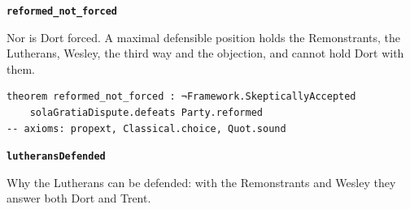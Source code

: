 \documentclass[11pt]{article}
\begin{document}
\par\medskip\noindent\textbf{\texttt{reformed\_\allowbreak{}not\_\allowbreak{}forced}}\par\nobreak\noindent
Nor is Dort forced. A maximal defensible position holds the Remonstrants, the Lutherans, Wesley, the third way and the objection, and cannot hold Dort with them.

{\small\begin{verbatim}
theorem reformed_not_forced : ¬Framework.SkepticallyAccepted
    solaGratiaDispute.defeats Party.reformed
-- axioms: propext, Classical.choice, Quot.sound
\end{verbatim}}
\par\medskip\noindent\textbf{\texttt{lutherans\allowbreak{}Defended}}\par\nobreak\noindent
Why the Lutherans can be defended: with the Remonstrants and Wesley they answer both Dort and Trent.
\end{document}
